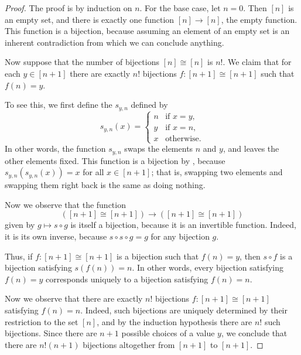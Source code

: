 \begin{proof}
  The proof is by induction on $n$. For the base case, let $n=0$. Then $[n]$ is an empty set, and there is exactly one function $[n]\to [n]$, the empty function. This function is a bijection, because assuming an element of an empty set is an inherent contradiction from which we can conclude anything.

  Now suppose that the number of bijections $[n]\cong[n]$ is $n!$. We claim that for each $y\in[n+1]$ there are exactly $n!$ bijections $f:[n+1]\cong[n+1]$ such that $f(n)=y$.

  To see this, we first define the  $s_{y,n}$ defined by
  \begin{equation*}
    s_{y,n}(x) =
    \begin{cases}
      n & \text{if }x=y, \\
      y & \text{if }x=n, \\
      x & \text{otherwise.}
    \end{cases}
  \end{equation*}
  In other words, the function $s_{y,n}$ swaps the elements $n$ and $y$, and leaves the other elements fixed. This function is a bijection by , because $s_{y,n}(s_{y,n}(x))=x$ for all $x\in[n+1]$; that is, swapping two elements and swapping them right back is the same as doing nothing.

  Now we observe that the function
  \begin{equation*}
    ([n+1]\cong[n+1])\to ([n+1]\cong[n+1])
  \end{equation*}
  given by $g\mapsto s\circ g$ is itself a bijection, because it is an invertible function. Indeed, it is its own inverse, because $s\circ s\circ g = g$ for any bijection $g$.

  Thus, if $f:[n+1]\cong[n+1]$ is a bijection such that $f(n)=y$, then $s\circ f$ is a bijection satisfying $s(f(n))=n$. In other words, every bijection satisfying $f(n)=y$ corresponds uniquely to a bijection satisfying $f(n)=n$.

  Now we observe that there are exactly $n!$ bijections $f:[n+1]\cong[n+1]$ satisfying $f(n)=n$. Indeed, such bijections are uniquely determined by their restriction to the set $[n]$, and by the induction hypothesis there are $n!$ such bijections. Since there are $n+1$ possible choices of a value $y$, we conclude that there are $n!(n+1)$ bijections altogether from $[n+1]$ to $[n+1]$.
\end{proof}

